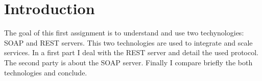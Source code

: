 \section*{Introduction}

The goal of this first assignment is to understand and use two techynologies: SOAP and REST
 servers. This two technologies are used to integrate and scale services.
 In a first part I deal with the REST server and detail the used protocol. The second party is about the SOAP server. Finally I compare briefly the both technologies and conclude.